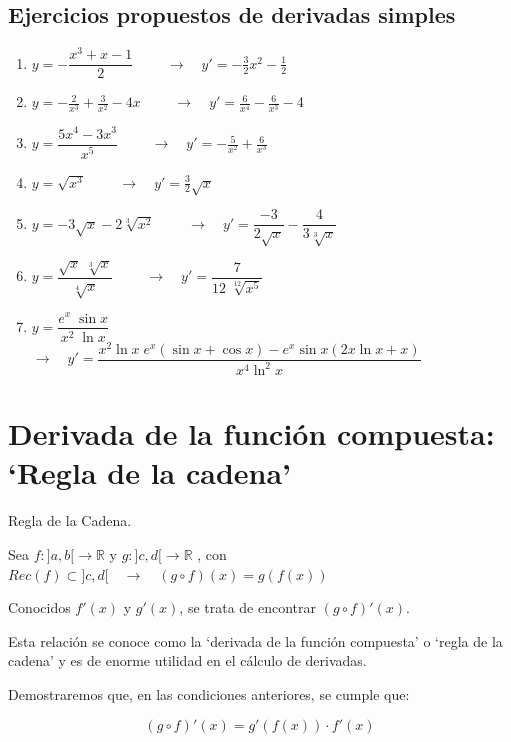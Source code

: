 	
	
	\subsection{Ejercicios propuestos de derivadas simples}
	
	\begin{enumerate}
		\item $y=-\dfrac {x^3+x-1}{2} \qquad $ \textcolor{gris}{$\to \quad y'=-\frac 3 2 x^2-\frac 1 2$}
		\item $y=- \frac 2 {x^3}+ \frac 3 {x^2}-4x \qquad$ \textcolor{gris}{$\to \quad y'=\frac 6 {x^4}-\frac 6 {x^3}-4$}
		\item $y=\dfrac {5x^4-3x^3}{x^5} \qquad$ \textcolor{gris}{$\to \quad y'=-\frac 5 {x^2}+\frac 6 {x^3}$}
		\item $y=\sqrt{x^3} \qquad$ \textcolor{gris}{$\to \quad y'=\frac 3 2 \sqrt{x}$}
		\item $y=-3 \sqrt{x}-2 \sqrt[3]{x^2} \qquad$ \textcolor{gris}{$\to \quad y'= \dfrac{-3}{2\sqrt{x}}-\dfrac{4}{3\sqrt[3]{x}}$}
		\item $y=\dfrac{\sqrt{x}\; \sqrt[3]{x}}{\sqrt[4]{x}} \qquad $ \textcolor{gris}{$\to \quad y'=\dfrac {7}{12\; \sqrt[12]{x^5}}$}
		\item $y=\dfrac{e^x \; \sin x}{x^2 \; \ln x} \qquad$ \textcolor{gris}{$\to \quad y'= \dfrac {x^2 \ln x \; e^x (\sin x +\cos x)- e^x \sin x (2x \ln x + x)}{x^4 \ln^2 x}$ }
		
	\end{enumerate}
	
	\section{Derivada de la función compuesta: `Regla de la cadena'}
	
		\begin{teor} Regla de la Cadena.
	\label{teor:regla-cadena}	
	
	Sea $f:]a,b[\to \mathbb R$ y $g:]c,d[\to \mathbb R$ , con $Rec(f) \subset ]c,d[ \quad \to \quad (g\circ f)(x)=g(f(x))$
	
	Conocidos $f'(x)$ y $g'(x)$, se trata de encontrar $(g\circ f)'(x)$.
	
	Esta relación se conoce como la `derivada de la función compuesta' o `regla de la cadena' y es de enorme utilidad en el cálculo de derivadas.
	
	Demostraremos que, en las condiciones anteriores, se cumple que:
	
	\begin{equation}
		(g\circ f)'(x)=g'\left( f(x)\right) \cdot f'(x)
	\end{equation}
	
	\end{teor}
	
